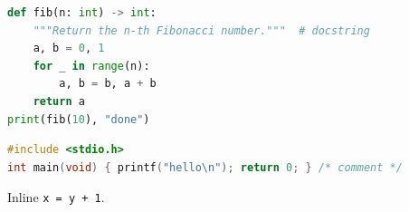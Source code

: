 \documentclass{article}
\begin{document}
\begin{lstlisting}[language=Python,caption={Python example}]
def fib(n: int) -> int:
    """Return the n-th Fibonacci number."""  # docstring
    a, b = 0, 1
    for _ in range(n):
        a, b = b, a + b
    return a
print(fib(10), "done")
\end{lstlisting}
\begin{lstlisting}[language=C]
#include <stdio.h>
int main(void) { printf("hello\n"); return 0; } /* comment */
\end{lstlisting}
Inline \lstinline|x = y + 1|.
\end{document}
